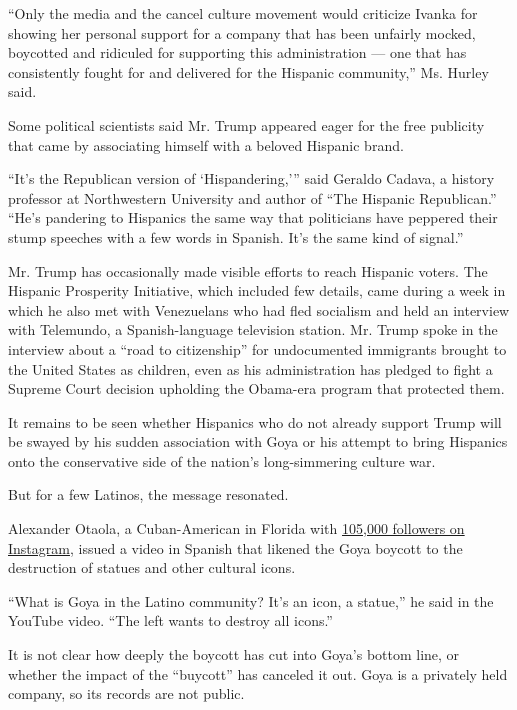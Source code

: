 ``Only the media and the cancel culture movement would criticize Ivanka
for showing her personal support for a company that has been unfairly
mocked, boycotted and ridiculed for supporting this administration ---
one that has consistently fought for and delivered for the Hispanic
community,'' Ms. Hurley said.

Some political scientists said Mr. Trump appeared eager for the free
publicity that came by associating himself with a beloved Hispanic
brand.

``It's the Republican version of `Hispandering,''' said Geraldo Cadava,
a history professor at Northwestern University and author of ``The
Hispanic Republican.'' ``He's pandering to Hispanics the same way that
politicians have peppered their stump speeches with a few words in
Spanish. It's the same kind of signal.''

Mr. Trump has occasionally made visible efforts to reach Hispanic
voters. The Hispanic Prosperity Initiative, which included few details,
came during a week in which he also met with Venezuelans who had fled
socialism and held an interview with Telemundo, a Spanish-language
television station. Mr. Trump spoke in the interview about a ``road to
citizenship'' for undocumented immigrants brought to the United States
as children, even as his administration has pledged to fight a Supreme
Court decision upholding the Obama-era program that protected them.

It remains to be seen whether Hispanics who do not already support Trump
will be swayed by his sudden association with Goya or his attempt to
bring Hispanics onto the conservative side of the nation's
long-simmering culture war.

But for a few Latinos, the message resonated.

Alexander Otaola, a Cuban-American in Florida with
\href{https://slack-redir.net/link?url=https\%3A\%2F\%2Fwww.instagram.com\%2Falexanderotaola\%2F}{105,000
followers on Instagram}, issued a video in Spanish that likened the Goya
boycott to the destruction of statues and other cultural icons.

``What is Goya in the Latino community? It's an icon, a statue,'' he
said in the YouTube video. ``The left wants to destroy all icons.''

It is not clear how deeply the boycott has cut into Goya's bottom line,
or whether the impact of the ``buycott'' has canceled it out. Goya is a
privately held company, so its records are not public.

